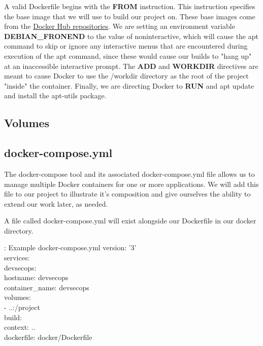 \justify{}
A valid Dockerfile begins with the \textbf{FROM} instruction. This
instruction specifies the base image that we will use to build our
project on. These base images come from the
\href{https://docs.docker.com/docker-hub/repos/}{Docker Hub
  repositories}. We are setting an environment variable
\textbf{DEBIAN\_FRONEND} to the value of noninteractive, which will
cause the apt command to skip or ignore any interactive menus that are
encountered during execution of the apt command, since these would cause
our builds to "hang up" at an inaccessible interactive prompt. The
\textbf{ADD} and \textbf{WORKDIR} directives are meant to cause Docker
to use the /workdir directory as the root of the project "inside" the
container. Finally, we are directing Docker to \textbf{RUN} and apt
update and install the apt-utils package.

\subsection{Volumes}

\subsection{docker-compose.yml}
\justify{}
The docker-compose tool and its associated docker-compose.yml file
allows us to manage multiple Docker containers for one or more
applications. We will add this file to our project to illustrate it's
composition and give ourselves the ability to extend our work later, as
needed.

\justify{}
A file called docker-compose.yml will exist alongside our Dockerfile in our docker directory.

\begin{mybox}{\thetcbcounter: Example docker-compose.yml}
  version: '3'\\
  services:\\
  \hspace*{7mm}devsecops:\\
  \hspace*{15mm}hostname: devsecops\\
  \hspace*{15mm}container\_name: devsecops\\
  \hspace*{7mm}volumes:\\
  \hspace*{15mm}- ..:/project\\
  \hspace*{7mm}build:\\
  \hspace*{15mm}context: ..\\
  \hspace*{15mm}dockerfile: docker/Dockerfile
\end{mybox}

